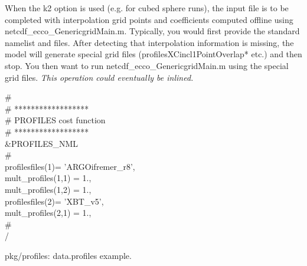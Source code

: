 \bigskip

When the k2 option is used (e.g. for cubed sphere runs), the input file is to be completed with interpolation grid points and coefficients computed offline using netcdf\_ecco\_GenericgridMain.m. Typically, you would first provide the standard namelist and files. After detecting that interpolation information is missing, the model will generate special grid files (profilesXCincl1PointOverlap* etc.) and then stop. You then want to run netcdf\_ecco\_GenericgridMain.m using the special grid files. {\it This operation could eventually be inlined.}

\bigskip

\begin{table}[htbp]
\begin{tabbing}
\#\\
\# ******************\\
\# PROFILES cost function\\
\# ****************** \\
\&PROFILES\_NML\\
\#\\
 profilesfiles(1)= 'ARGOifremer\_r8',\\
 mult\_profiles(1,1)   = 1.,\\
 mult\_profiles(1,2)   = 1.,\\
 profilesfiles(2)= 'XBT\_v5',\\
 mult\_profiles(2,1)   = 1.,\\
\#\\
 /\\
\end{tabbing}
\caption{pkg/profiles: data.profiles example.}
\label{PkgProfNamelist}
\end{table}



